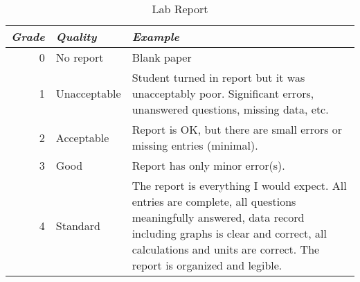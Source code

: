 \documentclass{article}
\begin{document}
\begin{table}[htbp]
\caption*{Lab Report}
\begin{tabularx}{\linewidth}{|r|l|X|}
\hline
\multicolumn{1}{|l|}{\emph{Grade}} & \emph{Quality} & \emph{Example} \\ \hline
0 & No report & Blank paper \\ \hline
1 & Unacceptable & Student turned in report but it was unacceptably poor.
                   Significant errors, unanswered questions, missing data, etc.
                   \\ \hline
2 & Acceptable & Report is OK, but there are small errors or missing entries
                 (minimal). \\ \hline
3 & Good & Report has only minor error(s). \\ \hline
4 & Standard & The report is everything I would expect. All entries are
               complete, all questions meaningfully answered, data record
               including graphs is clear and correct, all calculations and
               units are correct. The report is organized and legible.
               \\ \hline
\end{tabularx}
\label{}
\end{table}
\end{document}
